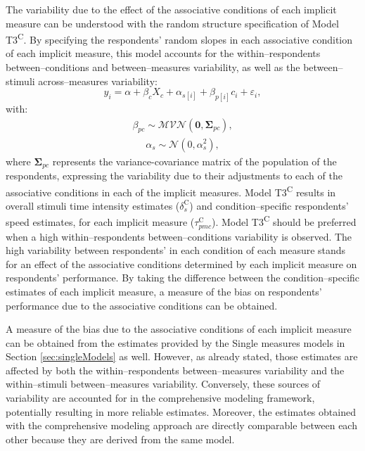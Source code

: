 \documentclass[12pt]{book}
\begin{document}
The variability due to the effect of the associative conditions of each implicit measure can be understood with the random structure specification of Model T3\textsuperscript{C}. By specifying the respondents' random slopes in each associative condition of each implicit measure, this model accounts for the within--respondents between--conditions and between--measures variability, as well as the between--stimuli across--measures variability: 
%
\begin{equation}\label{eq:type2t}
	y_{i} = \alpha + \beta_{c}X_{c} + \alpha_{s[i]} +  \beta_{p[i]}c_{i} + \varepsilon_{i},
\end{equation}
with:
\begin{align}
	\beta_{pc} \sim \mathcal{MVN}(\bm{0}, \bm{\Sigma}_{pc}),
\end{align}
\begin{align}
	\alpha_s \sim \mathcal{N} (0, \alpha_s^2),
\end{align}
where $\bm{\Sigma}_{pc}$ represents the variance-covariance matrix of the population of the respondents, expressing the variability due to their adjustments to each of the associative conditions in each of the implicit measures. 
Model T3\textsuperscript{C} results in overall stimuli time intensity estimates ($\delta_{s}^\text{C}$) and condition--specific respondents' speed estimates, for each implicit measure ($\tau_{pmc}^\text{C}$). 
Model T3\textsuperscript{C} should be preferred when a high within--respondents between--conditions variability is observed.
The high variability between respondents' in each condition of each measure stands for an effect of the associative conditions determined by each implicit measure on respondents' performance. 
By taking the difference between the condition--specific estimates of each implicit measure, a measure of the bias on respondents' performance due to the associative conditions can be obtained. 

A measure of the bias due to the associative conditions of each implicit measure can be obtained from the estimates provided by the Single measures models in Section \ref{sec:singleModels} as well. However, as already stated, those estimates are affected by both the within--respondents between--measures variability and the within--stimuli between--measures variability. Conversely, these sources of variability are accounted for in the comprehensive modeling framework, potentially resulting in more reliable estimates. Moreover, the estimates obtained with the comprehensive modeling approach are directly comparable between each other because they are derived from the same model.
\end{document}
